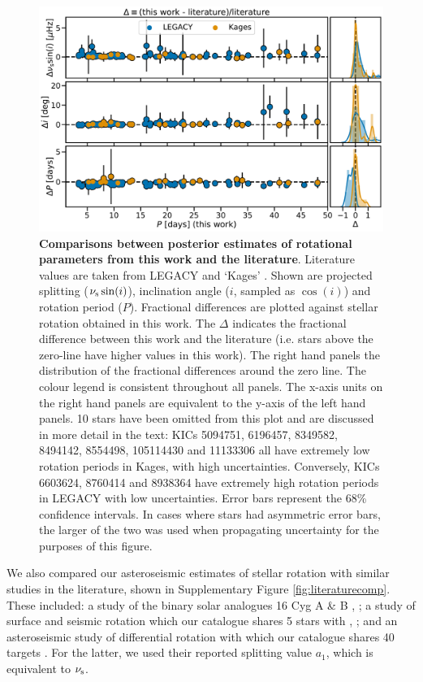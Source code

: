 \begin{figure}[h!]
	\centering
	\includegraphics[width=\textwidth]{Images/litcomp_alt2.pdf}
	\caption{\textbf{Comparisons between posterior estimates of rotational parameters from this work and the literature}. Literature values are taken from LEGACY and `Kages' \cite[private communication]{davies+2016, lund+2017}. Shown are projected splitting ($\nu_{\rm s}\sin(i)$), inclination angle ($i$, sampled as $\cos(i)$) and rotation period ($P$). Fractional differences are plotted against stellar rotation obtained in this work. The $\Delta$ indicates the fractional difference between this work and the literature (i.e. stars above the zero-line have higher values in this work). The right hand panels the distribution of the fractional differences around the zero line. The colour legend is consistent throughout all panels. The x-axis units on the right hand panels are equivalent to the y-axis of the left hand panels. 10 stars have been omitted from this plot and are discussed in more detail in the text: KICs 5094751, 6196457, 8349582, 8494142, 8554498, 105114430 and 11133306 all have extremely low rotation periods in Kages, with high uncertainties. Conversely, KICs 6603624, 8760414 and 8938364 have extremely high rotation periods in LEGACY with low uncertainties. Error bars represent the 68\% confidence intervals. In cases where stars had asymmetric error bars, the larger of the two was used when propagating uncertainty for the purposes of this figure.}
	\label{fig:legacykages}
\end{figure}

We also compared our asteroseismic estimates of stellar rotation with similar studies in the literature, shown in Supplementary Figure \ref{fig:literaturecomp}. These included: a study of the binary solar analogues 16 Cyg A \& B \cite{davies+2015}, ; a study of surface and seismic rotation which our catalogue shares 5 stars with \cite{nielsen+2015}, ; and an asteroseismic study of differential rotation with which our catalogue shares 40 targets \cite{benomar+2018}. For the latter, we used their reported splitting value $a_1$, which is equivalent to $\nu_{\rm s}$. 

